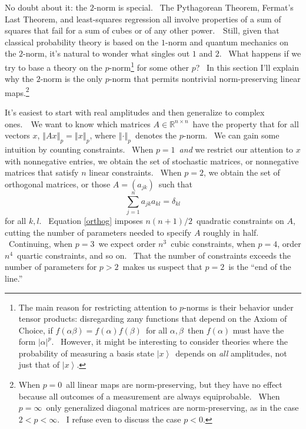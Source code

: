 \documentclass{article}%
\begin{document}
No doubt about it: the $2$-norm is special. \ The Pythagorean Theorem,
Fermat's Last Theorem, and least-squares regression all involve properties of
a sum of squares that fail for a sum of cubes or of any other power.\ \ Still,
given that classical probability theory is based on the $1$-norm and quantum
mechanics on the $2$-norm, it's natural to wonder what singles out $1$ and
$2$. \ What happens if we try to base a theory on the $p$-norm\footnote{The
main reason for restricting attention to $p$-norms is their behavior under
tensor products: disregarding zany functions that depend on the Axiom of
Choice, if $f\left(  \alpha\beta\right)  =f\left(  \alpha\right)  f\left(
\beta\right)  $\ for all $\alpha,\beta$\ then $f\left(  \alpha\right)  $ must
have the form $\left\vert \alpha\right\vert ^{p}$. \ However, it might be
interesting to consider theories where the probability of measuring a basis
state $\left\vert x\right\rangle $\ depends on \textit{all} amplitudes, not
just that of $\left\vert x\right\rangle $.} for some other $p$? \ In this
section I'll explain why the $2$-norm is the only $p$-norm that permits
nontrivial norm-preserving linear maps.\footnote{When $p=0$\ all linear maps
are norm-preserving, but they have no effect because all outcomes of a
measurement are always equiprobable. \ When $p=\infty$\ only generalized
diagonal matrices are norm-preserving, as in the case $2<p<\infty$. \ I refuse
even to discuss the case $p<0$.}

It's easiest to start with real amplitudes and then generalize to complex
ones.\ \ We want to know which matrices $A\in\mathbb{R}^{n\times n}$\ have the
property that for all vectors $x$, $\left\Vert Ax\right\Vert _{p}=\left\Vert
x\right\Vert _{p}$, where $\left\Vert \cdot\right\Vert _{p}$\ denotes the
$p$-norm. \ We can gain some intuition by counting constraints. \ When
$p=1$\ \textit{and} we restrict our attention to $x$ with nonnegative entries,
we obtain the set of stochastic matrices, or nonnegative matrices that satisfy
$n$ linear constraints. \ When $p=2$, we obtain the set of orthogonal
matrices, or those $A=\left(  a_{jk}\right)  $\ such that%
\begin{equation}
\sum_{j=1}^{n}a_{jk}a_{kl}=\delta_{kl} \label{orthog}%
\end{equation}
for all $k,l$. \ Equation \ref{orthog} imposes $n\left(  n+1\right)
/2$\ quadratic constraints on $A$, cutting the number of parameters needed to
specify $A$ roughly in half. \ Continuing, when $p=3$\ we expect order $n^{3}%
$\ cubic constraints, when $p=4$, order $n^{4}$\ quartic constraints, and so
on. \ That the number of constraints exceeds the number of parameters for
$p>2$\ makes us suspect that $p=2$\ is the \textquotedblleft end of the line.\textquotedblright
\end{document}

